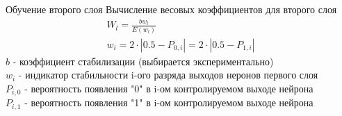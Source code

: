 \begin{frame}{Обучение второго слоя}
    Вычисление весовых коэффициентов для второго слоя
    \begin{gather*}
        W_l = \frac{bw_l}{E(w_l)} \\
        w_i =   2 \cdot |0.5 - P_{0,i}| = 2 \cdot |0.5 - P_{1,i}|
    \end{gather*}
    $b$ - коэффициент стабилизации (выбирается экспериментально) \\
    $w_i$ - индикатор стабильности i-ого разряда выходов неронов первого слоя \\
    $P_{i,0}$ - вероятность появления "0" в i-ом контролируемом выходе нейрона \\
    $P_{i,1}$ - вероятность появления "1" в i-ом контролируемом выходе нейрона \\
\end{frame}